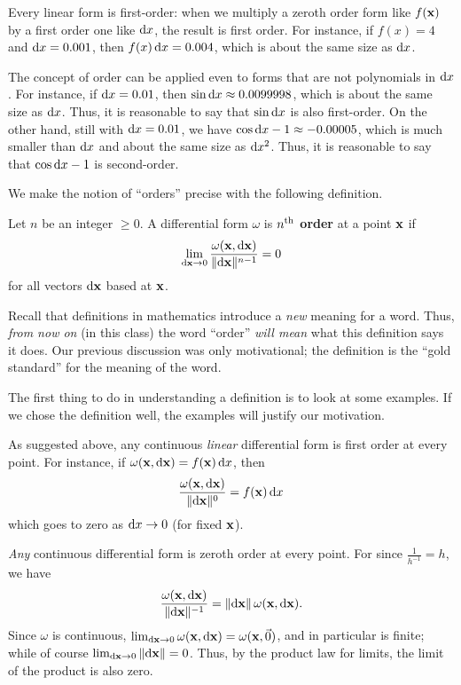 \documentclass[12pt]{amsart}
\begin{document}
Every linear form is first-order: when we multiply a zeroth order form like $f(\mathbf{x})$ by a first order one like $\mathrm{d} x$, the result is first order.
For instance, if $f(x) = 4$ and $\mathrm{d} x = 0.001$, then $f(x)\,\mathrm{d} x = 0.004$, which is about the same size as $\mathrm{d} x$.

The concept of order can be applied even to forms that are not polynomials in $\mathrm{d} x$.
For instance, if $\mathrm{d} x=0.01$, then $\sin \mathrm{d} x \approx 0.0099998$, which is about the same size as $\mathrm{d} x$.
Thus, it is reasonable to say that $\sin\mathrm{d} x$ is also first-order.
On the other hand, still with $\mathrm{d} x=0.01$, we have $\cos \mathrm{d} x - 1 \approx -0.00005$, which is much smaller than $\mathrm{d} x$ and about the same size as $\mathrm{d} x^2$.
Thus, it is reasonable to say that $\cos \mathrm{d} x - 1$ is second-order.

We make the notion of ``orders'' precise with the following definition.

\begin{defn}
  Let $n$ be an integer $\ge 0$.
  A differential form $\omega$ is \textbf{$n^{\mathrm{th}}$ order} at a point $\mathbf{x}$ if
  \[ \lim_{\mathrm{d} \mathbf{x}\to 0} \frac{\omega(\mathbf{x},\mathrm{d} \mathbf{x})}{\Vert \mathrm{d} \mathbf{x} \Vert^{n-1}} = 0 \]
  for all vectors $\mathrm{d} \mathbf{x}$ based at $\mathbf{x}$.
\end{defn}

Recall that definitions in mathematics introduce a \emph{new} meaning for a word.
Thus, \emph{from now on} (in this class) the word ``order'' \emph{will mean} what this definition says it does.
Our previous discussion was only motivational; the definition is the ``gold standard'' for the meaning of the word.

The first thing to do in understanding a definition is to look at some examples.
If we chose the definition well, the examples will justify our motivation.

\begin{eg}
  As suggested above, any continuous \emph{linear} differential form is first order at every point.
  For instance, if $\omega(\mathbf{x},\mathrm{d}\mathbf{x}) = f(\mathbf{x}) \, \mathrm{d} x$, then
  \[ \frac{\omega(\mathbf{x},\mathrm{d} \mathbf{x})}{\Vert \mathrm{d} \mathbf{x} \Vert^0} = f(\mathbf{x}) \, \mathrm{d} x\]
  which goes to zero as $\mathrm{d} x\to 0$ (for fixed $\mathbf{x}$).
\end{eg}

\begin{eg}
  \emph{Any} continuous differential form is zeroth order at every point.
  For since $\frac{1}{h^{-1}} = h$, we have
  \[\frac{\omega(\mathbf{x},\mathrm{d} \mathbf{x})}{\Vert \mathrm{d} \mathbf{x} \Vert^{-1}} = \Vert \mathrm{d} \mathbf{x} \Vert \, \omega(\mathbf{x},\mathrm{d} \mathbf{x}).\]
  Since $\omega$ is continuous, $\lim_{\mathrm{d} \mathbf{x}\to 0} \omega(\mathbf{x},\mathrm{d} \mathbf{x}) = \omega(\mathbf{x},\vec{0})$, and in particular is finite; while of course $\lim_{\mathrm{d} \mathbf{x}\to 0} \Vert \mathrm{d} \mathbf{x} \Vert = 0$.
  Thus, by the product law for limits, the limit of the product is also zero.
\end{eg}
\end{document}
